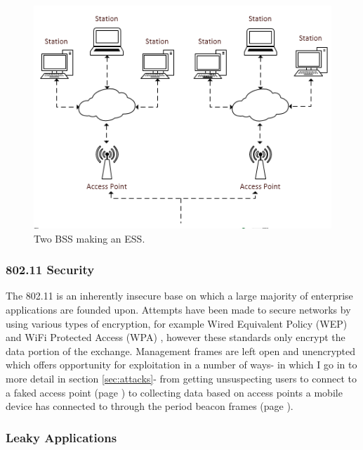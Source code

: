 \begin{figure}[htb!]
\centering\includegraphics{intro/diagrams/ess.png}
\caption{Two BSS making an ESS.}
\end{figure}
\newpage

\subsubsection{802.11 Security}

The 802.11 is an inherently insecure \cite{intro:80211_lecture} base on which a large majority of enterprise applications are founded upon. Attempts have been made to secure networks by using various types of encryption, for example Wired Equivalent Policy (WEP) \cite{intro:netgear_wep} and WiFi Protected Access (WPA) \cite{intro:wiki_wpa}, however these standards only encrypt the data portion of the exchange. Management frames are left open and unencrypted which offers opportunity for exploitation in a number of ways- in which I go in to more detail in section \ref{sec:attacks}- from getting unsuspecting users to connect to a faked access point (page \pageref{sec:spoofap}) to collecting data based on access points a mobile device has connected to through the period beacon frames (page \pageref{sec:honeypot}).
 
\subsubsection{Leaky Applications}

